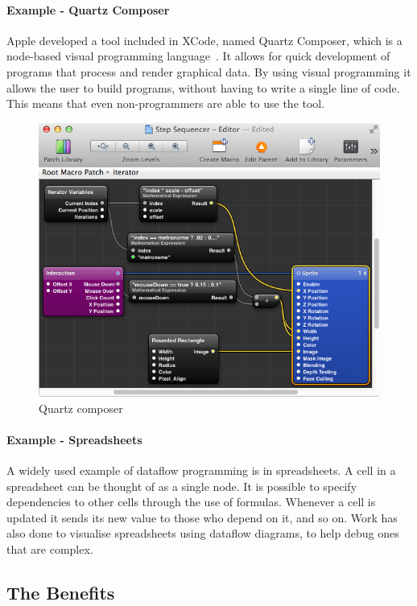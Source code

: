 \documentclass[dissertation.tex]{subfiles}
\begin{document}
\paragraph{Example - Quartz Composer}
Apple developed a tool included in XCode, named Quartz Composer, which is a node-based visual programming language~\cite{quartz}.
It allows for quick development of programs that process and render graphical data.
By using visual programming it allows the user to build programs, without having to write a single line of code.
This means that even non-programmers are able to use the tool.

\begin{figure}[ht]
  \centering
  \includegraphics[scale=0.3]{diagrams/quartz_composer.png}
  \caption{Quartz composer~\cite{costello_2012}}
\end{figure}


\paragraph{Example - Spreadsheets}
A widely used example of dataflow programming is in spreadsheets.
A cell in a spreadsheet can be thought of as a single node.
It is possible to specify dependencies to other cells through the use of formulas.
Whenever a cell is updated it sends its new value to those who depend on it, and so on.
Work has also done to visualise spreadsheets using dataflow diagrams, to help debug ones that are complex\cite{hermans2011breviz}.


\subsection{The Benefits}
\end{document}
